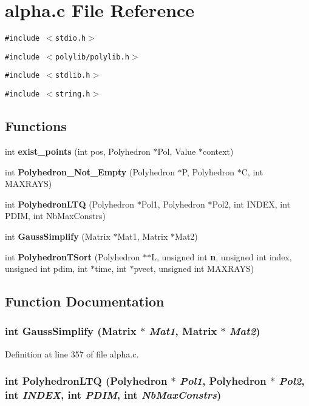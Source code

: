 \section{alpha.c File Reference}
\label{alpha_8c}
{\tt \#include $<$stdio.h$>$}\par
{\tt \#include $<$polylib/polylib.h$>$}\par
{\tt \#include $<$stdlib.h$>$}\par
{\tt \#include $<$string.h$>$}\par
\subsection*{Functions}
\begin{CompactItemize}
\item 
int {\bf exist\_\-points} (int pos, Polyhedron $\ast$Pol, Value $\ast$context)
\item 
int {\bf Polyhedron\_\-Not\_\-Empty} (Polyhedron $\ast$P, Polyhedron $\ast$C, int MAXRAYS)
\item 
int {\bf Polyhedron\-LTQ} (Polyhedron $\ast$Pol1, Polyhedron $\ast$Pol2, int INDEX, int PDIM, int Nb\-Max\-Constrs)
\item 
int {\bf Gauss\-Simplify} (Matrix $\ast$Mat1, Matrix $\ast$Mat2)
\item 
int {\bf Polyhedron\-TSort} (Polyhedron $\ast$$\ast$L, unsigned int {\bf n}, unsigned int index, unsigned int pdim, int $\ast$time, int $\ast$pvect, unsigned int MAXRAYS)
\end{CompactItemize}


\subsection{Function Documentation}
\subsubsection{\setlength{\rightskip}{0pt plus 5cm}int Gauss\-Simplify (Matrix $\ast$ {\em Mat1}, Matrix $\ast$ {\em Mat2})}\label{alpha_8c_a3}




Definition at line 357 of file alpha.c.
\subsubsection{\setlength{\rightskip}{0pt plus 5cm}int Polyhedron\-LTQ (Polyhedron $\ast$ {\em Pol1}, Polyhedron $\ast$ {\em Pol2}, int {\em INDEX}, int {\em PDIM}, int {\em Nb\-Max\-Constrs})}\label{alpha_8c_a2}




